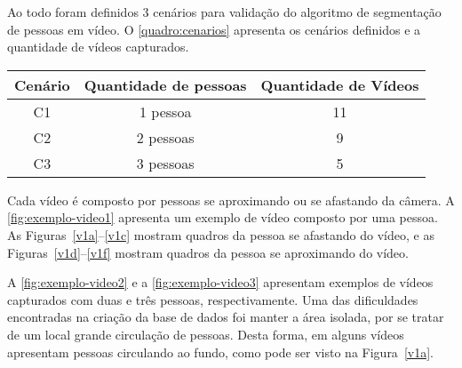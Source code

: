 \documentclass[12pt,oneside,a4paper,chapter=TITLE,section=TITLE,sumario=tradicional]{abntex2}
\begin{document}
\begin{figure}[htb]
    \fonteautor
\end{figure}

Ao todo foram definidos 3 cenários para validação do algoritmo de segmentação de pessoas em vídeo. O \autoref{quadro:cenarios} apresenta os cenários definidos e a quantidade de vídeos capturados.

\begin{quadro}[htb]
    \begin{tabular}{|c|c|c|}
        \hline
        \textbf{Cenário} & \textbf{Quantidade de pessoas} & \textbf{Quantidade de Vídeos} \\\hline 
          C1 & 1 pessoa  &  11 \\\hline
          C2 & 2 pessoas &  9 \\\hline
          C3 & 3 pessoas &  5 \\\hline
              \hline

    \end{tabular}
    
    \fonteautor
\end{quadro}


Cada vídeo é composto por pessoas se aproximando ou se afastando da câmera. A \autoref{fig:exemplo-video1} apresenta um exemplo de vídeo composto por uma pessoa. As Figuras~\ref{v1a}--\ref{v1c} mostram quadros da pessoa se afastando do vídeo, e as Figuras~\ref{v1d}--\ref{v1f} mostram quadros da pessoa se aproximando do vídeo.

\begin{figure}[htb]
    \hfil
    \hfil

    \hfil
    \hfil
    
    \fonteautor
\end{figure}

A \autoref{fig:exemplo-video2} e a \autoref{fig:exemplo-video3} apresentam exemplos de vídeos capturados com duas e três pessoas, respectivamente. Uma das dificuldades encontradas na criação da base de dados foi manter a área isolada, por se tratar de um local grande circulação de pessoas. Desta forma, em alguns vídeos apresentam pessoas circulando ao fundo, como pode ser visto na Figura~\autoref{v1a}.
\end{document}
